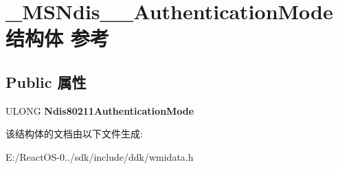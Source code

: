 \hypertarget{struct___m_s_ndis__80211___authentication_mode}{}\section{\+\_\+\+M\+S\+Ndis\+\_\+\_\+\+Authentication\+Mode结构体 参考}
\label{struct___m_s_ndis__80211___authentication_mode}
\subsection*{Public 属性}
\begin{DoxyCompactItemize}
\item 
\mbox{\label{struct___m_s_ndis__80211___authentication_mode_aa9375c0eaedbb4815ca72cf645e99859}} 
U\+L\+O\+NG {\bfseries Ndis80211\+Authentication\+Mode}
\end{DoxyCompactItemize}


该结构体的文档由以下文件生成\+:\begin{DoxyCompactItemize}
\item 
E\+:/\+React\+O\+S-\/0../sdk/include/ddk/wmidata.\+h\end{DoxyCompactItemize}

